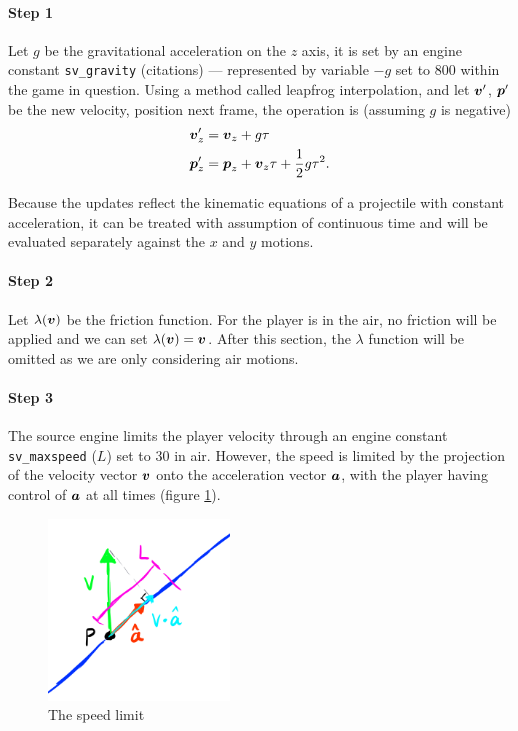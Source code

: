 \paragraph{Step 1} Let $g$ be the gravitational acceleration on the $z$ axis, it is set by an engine constant \verb|sv_gravity| (citations) --- represented by variable $-g$ set to $800$ within the game in question. Using a method called leapfrog interpolation, and let $\boldsymbol{v}'$, $\boldsymbol{p}'$ be the new velocity, position next frame, the operation is (assuming $g$ is negative)
\begin{align}
    \boldsymbol{v}'_z &= \boldsymbol{v}_z + g\tau \label{eq:gv}\\
    \boldsymbol{p}'_z &= \boldsymbol{p}_z + \boldsymbol{v}_z\tau + \frac{1}{2}g\tau^2 \label{eq:gp}.
\end{align}

Because the updates reflect the kinematic equations of a projectile with constant acceleration, it can be treated with assumption of continuous time and will be evaluated separately against the $x$ and $y$ motions.


\paragraph{Step 2} Let $\lambda(\boldsymbol{v})$ be the friction function. For the player is in the air, no friction will be applied and we can set $\lambda(\boldsymbol{v}) = \boldsymbol{v}$. After this section, the $\lambda$ function will be omitted as we are only considering air motions.

\paragraph{Step 3} The source engine limits the player velocity through an engine constant \verb|sv_maxspeed| ($L$) set to $30$ in air. However, the speed is limited by the projection of the velocity vector $\boldsymbol{v}$ onto the acceleration vector $\boldsymbol{a}$, with the player having control of $\boldsymbol{a}$ at all times (figure \ref{fig:speedlimit}).

\begin{figure}
    \includegraphics[width=0.43\textwidth,right]{assets/speedlimit.png}
    \caption{The speed limit}
    \label{fig:speedlimit}
\end{figure}

